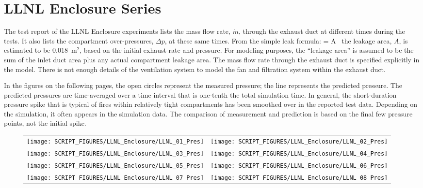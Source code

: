 \clearpage

\section{LLNL Enclosure Series}

The test report of the LLNL Enclosure experiments lists the mass flow rate, $\dot{m}$, through the exhaust duct at different times
during the tests. It also lists the compartment over-pressures, $\Delta p$, at these same times. From the simple leak formula:
\be {} = A \,  \ee
the leakage area, $A$, is estimated to be 0.018~m$^2$, based on the initial exhaust rate and pressure. 
For modeling purposes, the ``leakage area'' is assumed to be the sum of the
inlet duct area plus any actual compartment leakage area. The mass flow rate through the exhaust duct is specified explicitly in
the model. There is not enough details of the ventilation system to model the fan and filtration system within the exhaust duct.

In the figures on the following pages, the open circles represent the measured pressure; the line represents the predicted pressure. The
predicted pressures are time-averaged over a time interval that is one-tenth the total simulation time. In general, the short-duration pressure
spike that is typical of fires within relatively tight compartments has been smoothed over in the reported test data. Depending on the simulation, it
often appears in the simulation data. The comparison of measurement and prediction is based on the final few pressure points, not the
initial spike. 

\begin{figure}[p]
\begin{tabular*}{\textwidth}{l@{\extracolsep{\fill}}r}
\texttt{[image: SCRIPT\_FIGURES/LLNL\_Enclosure/LLNL\_01\_Pres]} &
\texttt{[image: SCRIPT\_FIGURES/LLNL\_Enclosure/LLNL\_02\_Pres]} \\
\texttt{[image: SCRIPT\_FIGURES/LLNL\_Enclosure/LLNL\_03\_Pres]} &
\texttt{[image: SCRIPT\_FIGURES/LLNL\_Enclosure/LLNL\_04\_Pres]} \\
\texttt{[image: SCRIPT\_FIGURES/LLNL\_Enclosure/LLNL\_05\_Pres]} &
\texttt{[image: SCRIPT\_FIGURES/LLNL\_Enclosure/LLNL\_06\_Pres]} \\
\texttt{[image: SCRIPT\_FIGURES/LLNL\_Enclosure/LLNL\_07\_Pres]} &
\texttt{[image: SCRIPT\_FIGURES/LLNL\_Enclosure/LLNL\_08\_Pres]}
\end{tabular*}
\label{LLNL_Enclosure_Pres_1}
\end{figure}

